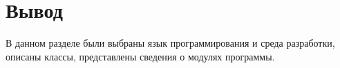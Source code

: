 




\section{Вывод}

В данном разделе были выбраны язык программирования и среда разработки, описаны  классы, представлены сведения о модулях программы.
